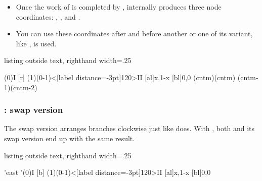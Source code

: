 \remark
\begin{itemize}\tightlist
\item
Once the work of \cmd{\istrootcntm} is completed by \cmd{\endist}, \cmd{\istrootcntm} internally produces three node coordinates: , , and .
\item You can use these coordinates after \cmd{\istrootcntm} and before another \cmd{\istrootcntm} or one of its variant, like  \cmd{\istrootcntmA}, is used.
\end{itemize}


\begin{tcblisting}{listing outside text, righthand width=.25\linewidth}
\begin{istgame}[scale=1.2]
\istrootcntm(0){I}
  [r]  \istbm  \endist
\xtdistance{10mm}{20mm}
\istroot(1)(0-1)<[label distance=-3pt]120>{II}
  [al]{x,1-x}  [bl]{0,0}  \endist
\xtInfosetO(cntm)(cntm)
\xtInfosetO[draw=none,fill=red,opacity=.3](cntm-1)(cntm-2)
\end{istgame}
\end{tcblisting}

\subsubsection*{\protect{}: swap version}

The swap version  arranges branches clockwise just like  does.
With , both \cmd{\istrootcntm} and its swap version  end up with the same result.

\begin{tcblisting}{listing outside text, righthand width=.25\linewidth}
\begin{istgame}[scale=1.2]
\setistgrowdirection'{east}
\istrootcntm'(0){I}
  [b]  \istbm  \endist
\xtdistance{10mm}{20mm}
\istroot(1)(0-1)<[label distance=-3pt]120>{II}
  [al]{x,1-x}  [bl]{0,0}  \endist
\end{istgame}
\end{tcblisting}



